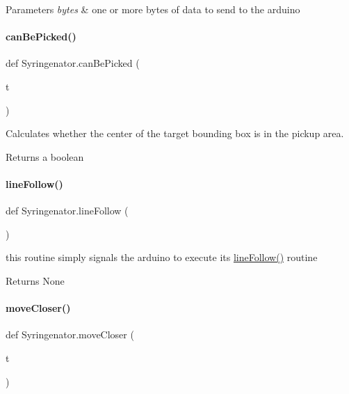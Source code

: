 \begin{DoxyParams}{Parameters}
{\em bytes} & one or more bytes of data to send to the arduino \\
\hline
\end{DoxyParams}
\mbox{\label{namespaceSyringenator_acb08d40f080a03cb4e7a43ee3ab4854b}} 
\paragraph{\texorpdfstring{canBePicked()}{canBePicked()}}
{\footnotesize\ttfamily def Syringenator.\+can\+Be\+Picked (\begin{DoxyParamCaption}\item[{}]{t }\end{DoxyParamCaption})}

Calculates whether the center of the target bounding box is in the pickup area.

\begin{DoxyReturn}{Returns}
a boolean 
\end{DoxyReturn}
\mbox{\label{namespaceSyringenator_a824ef6e71bc0975483435ffbdd58cb3e}} 
\paragraph{\texorpdfstring{lineFollow()}{lineFollow()}}
{\footnotesize\ttfamily def Syringenator.\+line\+Follow (\begin{DoxyParamCaption}{ }\end{DoxyParamCaption})}

this routine simply signals the arduino to execute its \mbox{\hyperlink{namespaceSyringenator_a824ef6e71bc0975483435ffbdd58cb3e}{line\+Follow()}} routine

\begin{DoxyReturn}{Returns}
None 
\end{DoxyReturn}
\mbox{\label{namespaceSyringenator_a6aecf5518c352d012eb1422d9970146d}} 
\paragraph{\texorpdfstring{moveCloser()}{moveCloser()}}
{\footnotesize\ttfamily def Syringenator.\+move\+Closer (\begin{DoxyParamCaption}\item[{}]{t }\end{DoxyParamCaption})}

